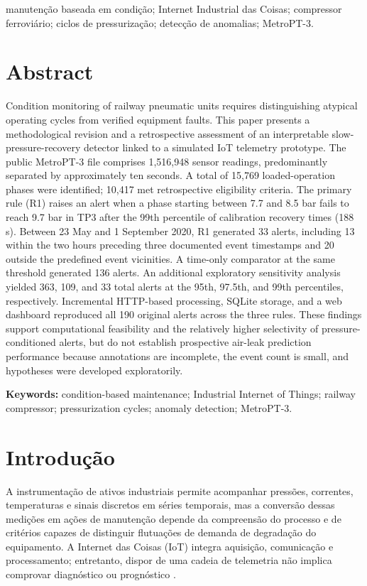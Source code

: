 \documentclass[conference]{IEEEtran}
\begin{document}
\begin{IEEEkeywords}
manutenção baseada em condição; Internet Industrial das Coisas; compressor ferroviário; ciclos de pressurização; detecção de anomalias; MetroPT-3.
\end{IEEEkeywords}

\section*{Abstract}
Condition monitoring of railway pneumatic units requires distinguishing atypical operating cycles from verified equipment faults. This paper presents a methodological revision and a retrospective assessment of an interpretable slow-pressure-recovery detector linked to a simulated IoT telemetry prototype. The public MetroPT-3 file comprises 1,516,948 sensor readings, predominantly separated by approximately ten seconds. A total of 15,769 loaded-operation phases were identified; 10,417 met retrospective eligibility criteria. The primary rule (R1) raises an alert when a phase starting between 7.7 and 8.5 bar fails to reach 9.7 bar in TP3 after the 99th percentile of calibration recovery times (188 s). Between 23 May and 1 September 2020, R1 generated 33 alerts, including 13 within the two hours preceding three documented event timestamps and 20 outside the predefined event vicinities. A time-only comparator at the same threshold generated 136 alerts. An additional exploratory sensitivity analysis yielded 363, 109, and 33 total alerts at the 95th, 97.5th, and 99th percentiles, respectively. Incremental HTTP-based processing, SQLite storage, and a web dashboard reproduced all 190 original alerts across the three rules. These findings support computational feasibility and the relatively higher selectivity of pressure-conditioned alerts, but do not establish prospective air-leak prediction performance because annotations are incomplete, the event count is small, and hypotheses were developed exploratorily.
\par\noindent\textbf{Keywords:} condition-based maintenance; Industrial Internet of Things; railway compressor; pressurization cycles; anomaly detection; MetroPT-3.

\section{Introdução}

A instrumentação de ativos industriais permite acompanhar pressões, correntes, temperaturas e sinais discretos em séries temporais, mas a conversão dessas medições em ações de manutenção depende da compreensão do processo e de critérios capazes de distinguir flutuações de demanda de degradação do equipamento. A Internet das Coisas (IoT) integra aquisição, comunicação e processamento; entretanto, dispor de uma cadeia de telemetria não implica comprovar diagnóstico ou prognóstico \cite{atzori2010survey,lee2015cps}.
\end{document}
